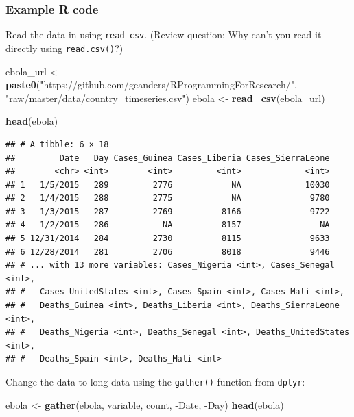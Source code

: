 \documentclass[]{book}
\makeatletter
\newenvironment{Shaded}{\begin{snugshade}}{\end{snugshade}}
\newcommand{\KeywordTok}[1]{\textcolor[rgb]{0.13,0.29,0.53}{\textbf{{#1}}}}
\newcommand{\StringTok}[1]{\textcolor[rgb]{0.31,0.60,0.02}{{#1}}}
\newcommand{\NormalTok}[1]{{#1}}
\newenvironment{kframe}{%
\medskip{}
\setlength{\fboxsep}{.8em}
 \def\at@end@of@kframe{}%
 \ifinner\ifhmode%
  \def\at@end@of@kframe{\end{minipage}}%
  \begin{minipage}{\columnwidth}%
 \fi\fi%
 \def\FrameCommand##1{\hskip\@totalleftmargin \hskip-\fboxsep
 \colorbox{shadecolor}{##1}\hskip-\fboxsep
     \hskip-\linewidth \hskip-\@totalleftmargin \hskip\columnwidth}%
 \MakeFramed {\advance\hsize-\width
   \@totalleftmargin\z@ \linewidth\hsize
   \@setminipage}}%
 {\par\unskip\endMakeFramed%
 \at@end@of@kframe}
\renewenvironment{Shaded}{\begin{kframe}}{\end{kframe}}
\makeatother
\begin{document}
\subsubsection{Example R code}\label{example-r-code-9}

Read the data in using \texttt{read\_csv}. (Review question: Why can't
you read it directly using \texttt{read.csv()}?)

\begin{Shaded}
\begin{Highlighting}[]
\NormalTok{ebola_url <-}\StringTok{ }\KeywordTok{paste0}\NormalTok{(}\StringTok{"https://github.com/geanders/RProgrammingForResearch/"}\NormalTok{,}
              \StringTok{"raw/master/data/country_timeseries.csv"}\NormalTok{)}
\NormalTok{ebola <-}\StringTok{ }\KeywordTok{read_csv}\NormalTok{(ebola_url)}

\KeywordTok{head}\NormalTok{(ebola)}
\end{Highlighting}
\end{Shaded}

\begin{verbatim}
## # A tibble: 6 × 18
##         Date   Day Cases_Guinea Cases_Liberia Cases_SierraLeone
##        <chr> <int>        <int>         <int>             <int>
## 1   1/5/2015   289         2776            NA             10030
## 2   1/4/2015   288         2775            NA              9780
## 3   1/3/2015   287         2769          8166              9722
## 4   1/2/2015   286           NA          8157                NA
## 5 12/31/2014   284         2730          8115              9633
## 6 12/28/2014   281         2706          8018              9446
## # ... with 13 more variables: Cases_Nigeria <int>, Cases_Senegal <int>,
## #   Cases_UnitedStates <int>, Cases_Spain <int>, Cases_Mali <int>,
## #   Deaths_Guinea <int>, Deaths_Liberia <int>, Deaths_SierraLeone <int>,
## #   Deaths_Nigeria <int>, Deaths_Senegal <int>, Deaths_UnitedStates <int>,
## #   Deaths_Spain <int>, Deaths_Mali <int>
\end{verbatim}

Change the data to long data using the \texttt{gather()} function from
\texttt{dplyr}:

\begin{Shaded}
\begin{Highlighting}[]
\NormalTok{ebola <-}\StringTok{ }\KeywordTok{gather}\NormalTok{(ebola, variable, count, -Date, -Day)}
\KeywordTok{head}\NormalTok{(ebola)}
\end{Highlighting}
\end{Shaded}
\end{document}
